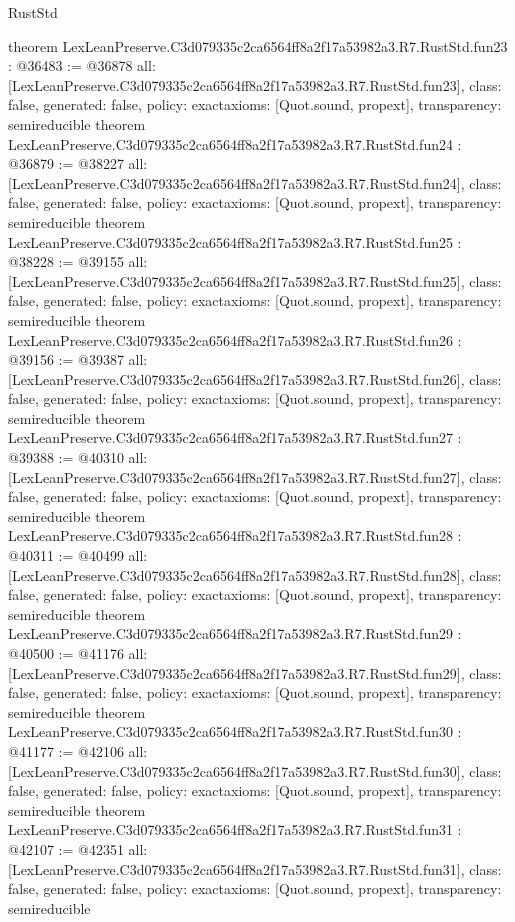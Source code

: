\begin{lexlean}{RustStd}
\begin{coremodule}
{}
theorem LexLeanPreserve.C3d079335c2ca6564ff8a2f17a53982a3.R7.RustStd.fun23 : @36483 := @36878 {
  all: [LexLeanPreserve.C3d079335c2ca6564ff8a2f17a53982a3.R7.RustStd.fun23],
  class: false,
  generated: false,
  policy: exact{axioms: [Quot.sound, propext]},
  transparency: semireducible
}
theorem LexLeanPreserve.C3d079335c2ca6564ff8a2f17a53982a3.R7.RustStd.fun24 : @36879 := @38227 {
  all: [LexLeanPreserve.C3d079335c2ca6564ff8a2f17a53982a3.R7.RustStd.fun24],
  class: false,
  generated: false,
  policy: exact{axioms: [Quot.sound, propext]},
  transparency: semireducible
}
theorem LexLeanPreserve.C3d079335c2ca6564ff8a2f17a53982a3.R7.RustStd.fun25 : @38228 := @39155 {
  all: [LexLeanPreserve.C3d079335c2ca6564ff8a2f17a53982a3.R7.RustStd.fun25],
  class: false,
  generated: false,
  policy: exact{axioms: [Quot.sound, propext]},
  transparency: semireducible
}
theorem LexLeanPreserve.C3d079335c2ca6564ff8a2f17a53982a3.R7.RustStd.fun26 : @39156 := @39387 {
  all: [LexLeanPreserve.C3d079335c2ca6564ff8a2f17a53982a3.R7.RustStd.fun26],
  class: false,
  generated: false,
  policy: exact{axioms: [Quot.sound, propext]},
  transparency: semireducible
}
theorem LexLeanPreserve.C3d079335c2ca6564ff8a2f17a53982a3.R7.RustStd.fun27 : @39388 := @40310 {
  all: [LexLeanPreserve.C3d079335c2ca6564ff8a2f17a53982a3.R7.RustStd.fun27],
  class: false,
  generated: false,
  policy: exact{axioms: [Quot.sound, propext]},
  transparency: semireducible
}
theorem LexLeanPreserve.C3d079335c2ca6564ff8a2f17a53982a3.R7.RustStd.fun28 : @40311 := @40499 {
  all: [LexLeanPreserve.C3d079335c2ca6564ff8a2f17a53982a3.R7.RustStd.fun28],
  class: false,
  generated: false,
  policy: exact{axioms: [Quot.sound, propext]},
  transparency: semireducible
}
theorem LexLeanPreserve.C3d079335c2ca6564ff8a2f17a53982a3.R7.RustStd.fun29 : @40500 := @41176 {
  all: [LexLeanPreserve.C3d079335c2ca6564ff8a2f17a53982a3.R7.RustStd.fun29],
  class: false,
  generated: false,
  policy: exact{axioms: [Quot.sound, propext]},
  transparency: semireducible
}
theorem LexLeanPreserve.C3d079335c2ca6564ff8a2f17a53982a3.R7.RustStd.fun30 : @41177 := @42106 {
  all: [LexLeanPreserve.C3d079335c2ca6564ff8a2f17a53982a3.R7.RustStd.fun30],
  class: false,
  generated: false,
  policy: exact{axioms: [Quot.sound, propext]},
  transparency: semireducible
}
theorem LexLeanPreserve.C3d079335c2ca6564ff8a2f17a53982a3.R7.RustStd.fun31 : @42107 := @42351 {
  all: [LexLeanPreserve.C3d079335c2ca6564ff8a2f17a53982a3.R7.RustStd.fun31],
  class: false,
  generated: false,
  policy: exact{axioms: [Quot.sound, propext]},
  transparency: semireducible
}
\end{coremodule}
\end{lexlean}
